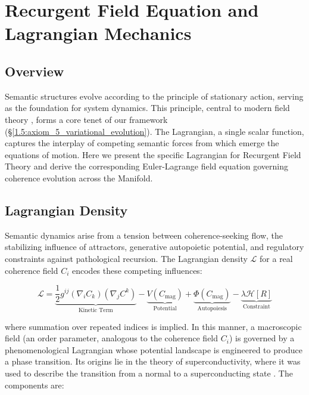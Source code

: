 \chapter{Recurgent Field Equation and Lagrangian Mechanics}
\label{6:recurgent_field_equation_and_lagrangian_mechanics}


\section{Overview}
\label{6.1:overview}

Semantic structures evolve according to the principle of stationary action, serving as the foundation for system dynamics. This principle, central to modern field theory \autocite{GoldsteinPooleSafko2002, Arnold1989}, forms a core tenet of our framework (\S\ref{1.5:axiom_5_variational_evolution}). The Lagrangian, a single scalar function, captures the interplay of competing semantic forces from which emerge the equations of motion. Here we present the specific Lagrangian for Recurgent Field Theory and derive the corresponding Euler-Lagrange field equation governing coherence evolution across the Manifold.


\section{Lagrangian Density}
\label{6.2:lagrangian_density}

Semantic dynamics arise from a tension between coherence-seeking flow, the stabilizing influence of attractors, generative autopoietic potential, and regulatory constraints against pathological recursion. The Lagrangian density \(\mathcal{L}\) for a real coherence field \(C_i\) encodes these competing influences:

\begin{equation}
\mathcal{L} = \underbrace{\frac{1}{2} g^{ij} (\nabla_i C_k)(\nabla_j C^k)}_{\text{Kinetic Term}} - \underbrace{V(C_{\text{mag}})}_{\text{Potential}} + \underbrace{\Phi(C_{\text{mag}})}_{\text{Autopoiesis}} - \underbrace{\lambda \mathcal{H}[R]}_{\text{Constraint}}
\end{equation}

where summation over repeated indices is implied. In this manner, a macroscopic field (an order parameter, analogous to the coherence field \(C_i\)) is governed by a phenomenological Lagrangian whose potential landscape is engineered to produce a phase transition. Its origins lie in the theory of superconductivity, where it was used to describe the transition from a normal to a superconducting state \autocite{GinzburgLandau1950}. The components are:

